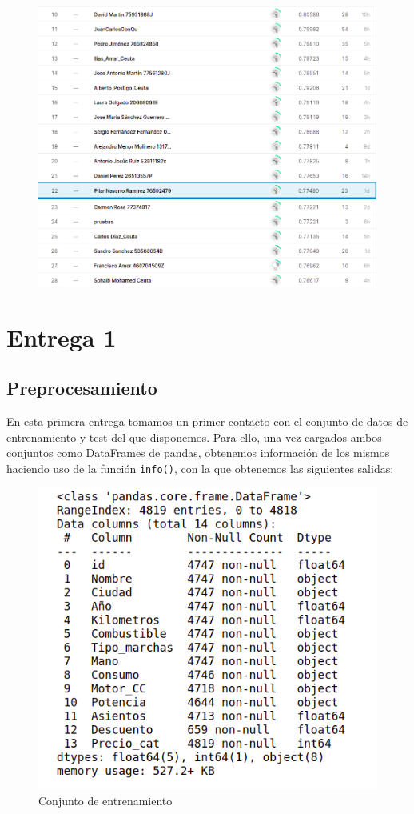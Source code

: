 \documentclass[a4paper,11pt]{article}
\begin{document}

%


\newpage

\begin{figure}[H]
	\centering
	\includegraphics[width=1\linewidth]{img/resultados}
	\caption{}
	\label{fig:resultados}
\end{figure}
\newpage
\tableofcontents

\newpage
\section{Entrega 1}
\subsection{Preprocesamiento}
En esta primera entrega tomamos un primer contacto con el conjunto de datos de entrenamiento y test del que disponemos. Para ello, una vez cargados ambos conjuntos como DataFrames de pandas, obtenemos información de los mismos haciendo uso de la función \texttt{info()}, con la que obtenemos las siguientes salidas:

\begin{figure}[H]
	\centering
	\includegraphics[width=0.5\linewidth]{img/train}
	\caption{Conjunto de entrenamiento}
	\label{fig:train}
\end{figure}
\end{document}

